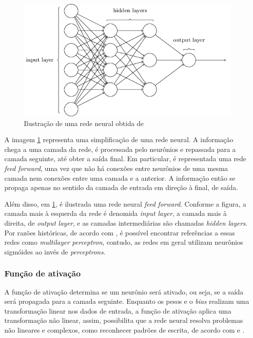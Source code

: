 \begin{figure}[H] 
  \includegraphics[width= 12cm]{../figuras/redes/rede_mlp.png}
  \caption{Ilustração de uma rede neural obtida de 
  \citet{neuralnetworksanddeeplearning}} 
  \label{fig:redeneural}
\end{figure}

A imagem \ref{fig:redeneural} representa uma simplificação de uma 
rede neural. A informação chega a uma camada da rede, é processada pelo neurônios e repassada para a camada seguinte, até obter a saída final. Em particular, é representada uma
rede \textit{feed forward}, uma vez que não há conexões entre neurônios de uma 
mesma camada nem conexões entre uma camada e a anterior. A informação então 
se propaga apenas no sentido da camada de entrada em direção à final, de saída.


Além disso, em \ref{fig:redeneural}, é ilustrada uma rede neural \textit{feed forward}.
Conforme a figura, a camada mais à esquerda da rede é 
denomida \textit{input layer}, a camada mais à direita, de \textit{output layer},
e as camadas intermediárias são chamadas \textit{hidden layers}.
Por razões históricas, de acordo com \citet{neuralnetworksanddeeplearning}, é possível encontrar referências a essas redes como
\textit{multilayer perceptron}, contudo, as redes em geral
utilizam neurônios sigmóides ao invés de \textit{perceptrons}.

\subsubsection{Função de ativação}
\label{sec:funcao_ativacao}

A função de ativação determina se um neurônio será ativado, ou seja, 
se a saída será propagada para a camada seguinte. Enquanto os pesos 
e o \textit{bias} realizam uma transformação linear nos dados 
de entrada, a função de ativação aplica uma transformação não
linear, assim, possibilita que a rede neural resolva
problemas não lineares e complexos, como reconhecer padrões de 
escrita, de acordo com \citet{deeplearningbook} e \citet{zhang2021dive}. 

